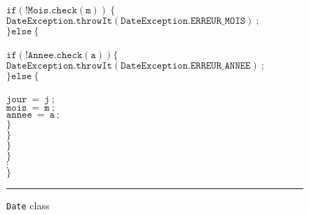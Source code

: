 \documentclass[a4paper]{llncs}
\begin{document}
\begin{center}
\begin{figure}[hbt]
\begin{tabbing}
\>\> \\
\>\>\>$\mathtt{if(!Mois.check(m))\ \{}$\\
\>\>\>\>$\mathtt{DateException.throwIt(DateException.ERREUR\_MOIS)\ ;}$ \\
\>\>\>$\mathtt{\}else\ \{}$ \\
\>\>\> \\
\>\>\>\>$\mathtt{if(!Annee.check(a)) \{}$ \\
\>\>\>\>\>$\mathtt{DateException.throwIt(DateException.ERREUR\_ANNEE)\ ;}$ \\
\>\>\>\>$\mathtt{\}else\ \{}$ \\
\>\>\>\> \\
\>\>\>\>\>$\mathtt{jour\ =\ j\ ;} $\\
\>\>\>\>\>$\mathtt{mois\ =\ m\ ;} $\\
\>\>\>\>\>$\mathtt{annee\ =\ a\ ;} $\\
\>\>\>\>$\mathtt{\}}$ \\
\>\>\>$\mathtt{\}} $\\
\>\>$\mathtt{\}} $\\
\>$\mathtt{\}} $\\
\>$\vdots$ \\
$\mathtt{\}}$ \\
\end{tabbing}
\caption{{\tt Date} class}
\label{fig-cla-dat}
\rule{\linewidth}{0.3mm}
\end{figure}
\end{center}
\end{document}
